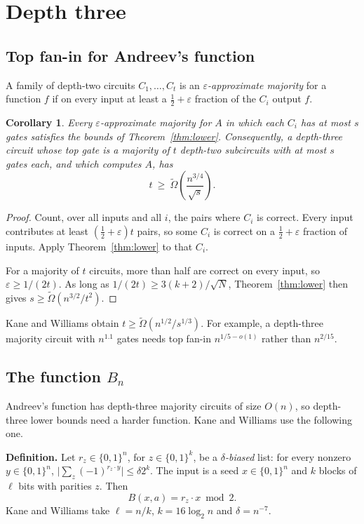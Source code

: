 \documentclass[11pt,letterpaper]{article}
\newtheorem{corollary}{Corollary}
\newcommand{\bits}{\{0,1\}}
\newcommand{\sect}[1]{\section{\color{ink}#1}}
\newcommand{\subsect}[1]{\subsection*{\color{ink}#1}}
\begin{document}
\sect{Depth three}\label{sec:depth3}

\subsect{Top fan-in for Andreev's function}

A family of depth-two circuits $C_1,\dots,C_t$ is an
\emph{$\varepsilon$-approximate majority} for a function $f$ if on every
input at least a $\tfrac12+\varepsilon$ fraction of the $C_i$ output $f$.

\begin{corollary}\label{cor:fanin}
Every $\varepsilon$-approximate majority for $A$ in which each $C_i$ has at
most $s$ gates satisfies the bounds of Theorem~\ref{thm:lower}. Consequently,
a depth-three circuit whose top gate is a majority of $t$ depth-two
subcircuits with at most $s$ gates each, and which computes $A$, has
\[
t\ \ge\ \tilde\Omega\!\left(\frac{n^{3/4}}{\sqrt s}\right).
\]
\end{corollary}
\begin{proof}
Count, over all inputs and all $i$, the pairs where $C_i$ is correct. Every
input contributes at least $(\tfrac12+\varepsilon)t$ pairs, so some $C_i$ is
correct on a $\tfrac12+\varepsilon$ fraction of inputs. Apply
Theorem~\ref{thm:lower} to that $C_i$.

For a majority of $t$ circuits, more than half are correct on every input,
so $\varepsilon\ge1/(2t)$. As long as $1/(2t)\ge3(k+2)/\sqrt N$,
Theorem~\ref{thm:lower} then gives $s\ge\tilde\Omega(n^{3/2}/t^2)$.
\end{proof}
Kane and Williams obtain $t\ge\tilde\Omega(n^{1/2}/s^{1/3})$. For example, a
depth-three majority circuit with $n^{1.1}$ gates needs top fan-in
$n^{1/5-o(1)}$ rather than $n^{2/15}$.

\subsect{The function \texorpdfstring{$B_n$}{B\_n}}

Andreev's function has depth-three majority circuits of size $O(n)$, so
depth-three lower bounds need a harder function. Kane and Williams use the
following one.

\begin{keybox}
\textbf{Definition.} Let $r_z\in\bits^n$, for $z\in\bits^k$, be a
\emph{$\delta$-biased} list: for every nonzero $y\in\bits^n$,
$\bigl|\sum_z(-1)^{r_z\cdot y}\bigr|\le\delta 2^k$. The input is a seed
$x\in\bits^n$ and $k$ blocks of $\ell$ bits with parities $z$. Then
\[
B(x,a)=r_z\cdot x \bmod 2 .
\]
Kane and Williams take $\ell=n/k$, $k=16\log_2n$ and $\delta=n^{-7}$.
\end{keybox}
\end{document}
